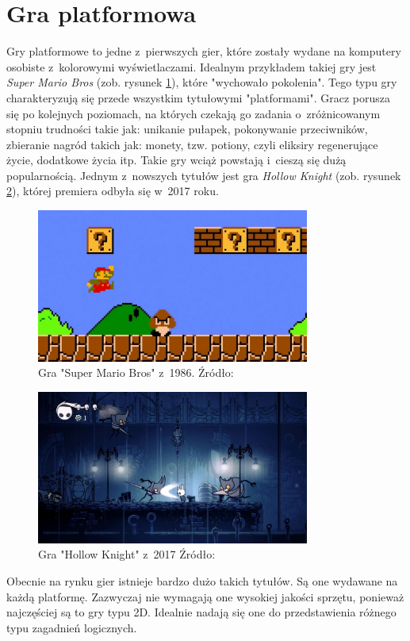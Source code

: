 \documentclass[12pt,a4paper,oneside]{book}
\theoremstyle{definition}
\numberwithin{equation}{chapter}
\begin{document}
\section{Gra platformowa}
Gry platformowe to jedne z~pierwszych gier, które zostały wydane na komputery osobiste z~kolorowymi wyświetlaczami. Idealnym przykładem takiej gry jest \textit{Super Mario Bros} (zob. rysunek \ref{fig:SuperMarioBros}), które "wychowało pokolenia". Tego typu gry charakteryzują się przede wszystkim tytułowymi "platformami". Gracz porusza się po kolejnych poziomach, na których czekają go zadania o~zróżnicowanym stopniu trudności takie jak: unikanie pułapek, pokonywanie przeciwników, zbieranie nagród takich jak: monety, tzw. potiony, czyli eliksiry regenerujące życie, dodatkowe życia itp. Takie gry wciąż powstają i~cieszą się dużą popularnością. Jednym z~nowszych tytułów jest gra \textit{Hollow Knight} (zob. rysunek \ref{fig:HollowKnight}), której premiera odbyła się w~2017 roku.
\begin{figure}[hpt!]
        \centering
        \includegraphics[width=0.8\textwidth]{images/super-mario-bros.jpg}
        \caption{Gra "Super Mario Bros" z~1986. Źródło: \cite{Mario}}
        \label{fig:SuperMarioBros}
    \end{figure}
       \begin{figure}[hpt!]
        \centering
        \includegraphics[width=0.8\textwidth]{images/Hollow-Knight-1-1.jpg}
        \caption{Gra "Hollow Knight" z~2017 Źródło: \cite{HollowKnight}}
        \label{fig:HollowKnight}
    \end{figure}
\newpage
\par Obecnie na rynku gier istnieje bardzo dużo takich tytułów. Są one wydawane na każdą platformę. Zazwyczaj nie wymagają one wysokiej jakości sprzętu, ponieważ najczęściej są to gry typu 2D. Idealnie nadają się one do przedstawienia różnego typu zagadnień logicznych.
\end{document}

